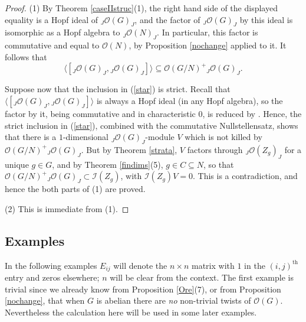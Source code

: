 \documentclass{amsart}
\numberwithin{equation}{section}
\theoremstyle{definition}
\begin{document}
\begin{proof}
(1) By Theorem \ref{caseIIstruc}(1), the right hand side of the displayed equality is a Hopf ideal of ${}_J\mathcal{O}(G)_J$, and the factor of ${}_J\mathcal{O}(G)_J$ by this ideal is isomorphic as a Hopf algebra to ${}_J\mathcal{O}(N)_J$. In particular, this factor is commutative and equal to $\mathcal{O}(N)$, by Proposition \ref{nochange} applied to it. It follows that 
\begin{equation}\label{star}
\langle [ {}_J\mathcal{O}(G)_J, {}_J\mathcal{O}(G)_J] \rangle \subseteq \mathcal{O}(G/N)^+{}_J\mathcal{O}(G)_J.
\end{equation} 

Suppose now that the inclusion in (\ref{star}) is strict. Recall that 
$\langle [{}_J\mathcal{O}(G)_J, {}_J\mathcal{O}(G)_J] \rangle $ is always a Hopf ideal (in any Hopf algebra), so the factor by it, being commutative and in characteristic 0, is reduced  
by \cite[\S 11.4]{W}. Hence, the strict inclusion in (\ref{star}), combined with the commutative Nullstellensatz, shows that there is a $1$-dimensional ${}_J\mathcal{O}(G)_J$-module $V$ which is not killed by $\mathcal{O}(G/N)^+{}_J\mathcal{O}(G)_J$. But by Theorem \ref{strata}, $V$ factors through ${}_J\mathcal{O}(Z_g)_J$ for a unique $g \in G$, and by Theorem \ref{findims}(5), $g \in C \subseteq N$, so that $\mathcal{O}(G/N)^+{}_J\mathcal{O}(G)_J \subset \mathcal{I}(Z_g)$, with $\mathcal{I}(Z_g)V = 0$. This is a contradiction, and hence the both parts of (1) are proved.

(2) This is immediate from (1). 
\end{proof}

\subsection{Examples}\label{examples2} In the following examples $E_{ij}$ will denote the $n \times n$ matrix with $1$ in the $(i,j)^{\mathrm{th}}$ entry and zeros elsewhere; $n$ will be clear from the context. The first example is trivial since we already know from Proposition \ref{Ore}(7), or from Proposition \ref{nochange}, that when $G$ is abelian there are \emph{no} non-trivial twists of $\mathcal{O}(G)$. Nevertheless the calculation here will be used in some later examples. 
\end{document}
